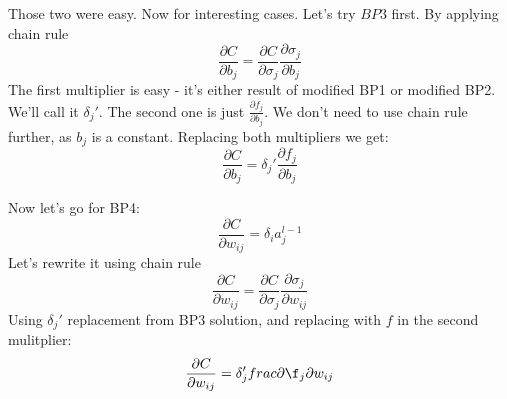 \documentclass{article}
\begin{document}
Those two were easy. Now for interesting cases. Let's try $BP3$ first. By applying chain rule
$$\frac{\partial C}{\partial b_j} = \frac{\partial C}{\partial \sigma_j} \frac{\partial \sigma_j}{\partial b_j}$$
The first multiplier is easy - it's either result of modified BP1 or modified BP2. We'll call it $\delta_j'$.
The second one is just $\frac{\partial f_j}{\partial b_j}$. We don't need to use chain rule further, as $b_j$ is a constant.
Replacing both multipliers we get:
$$\frac{\partial C}{\partial b_j} = \delta_j' \frac{\partial f_j}{\partial b_j}$$

Now let's go for BP4:
$$\frac{\partial C}{\partial w_{ij}} = \delta_i a^{l-1}_{j}$$
Let's rewrite it using chain rule
$$\frac{\partial C}{\partial w_{ij}} = \frac{\partial C}{\partial \sigma_j} \frac{\partial \sigma_j}{\partial w_{ij}}$$
Using $\delta_j'$ replacement from BP3 solution, and replacing \sigma with $f$ in the second mulitplier:
$$\frac{\partial C}{\partial w_{ij}} = \delta_j' frac{\partial \f_j}{\partial w_{ij}}$$
\end{document}
